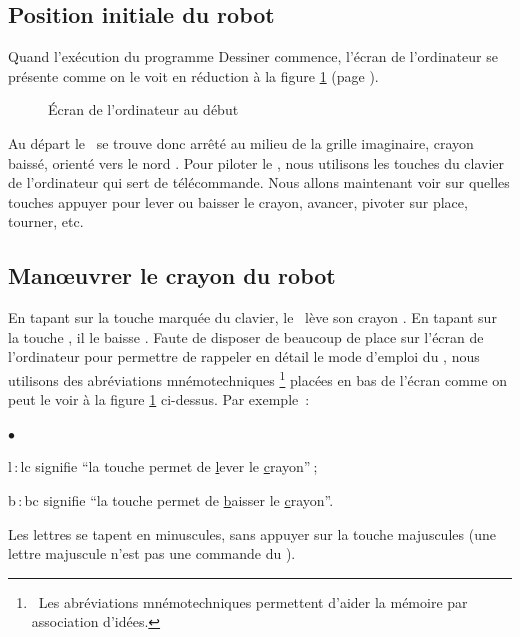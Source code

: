 \subsection{Position initiale du robot}

Quand l'exécution du programme {\idt Des\-si\-ner}
commence, l'écran 
de l'ordinateur se présente comme on le voit en réduction à la figure 
\ref{fig:ecran-initial-1}  (page \pageref{fig:ecran-initial-1}).
\begin{figure}[htbp]
 \caption{Écran de l'ordinateur au début}
 \label{fig:ecran-initial-1}
\end{figure}
Au départ le \robot\ se trouve donc arrêté au milieu de la grille
imaginaire, crayon baissé, or\-ienté vers le nord \robotCbN\/.
Pour piloter le \robot, nous utilisons les touches du clavier de 
l'ordinateur qui sert de télécommande. Nous allons maintenant
voir sur quelles touches appuyer pour lever ou baisser le crayon, 
avancer, pivoter sur place, tourner, etc.

\subsection{Manœuvrer le crayon du robot}

 En tapant sur la touche marquée  du
clavier, le \robot\ lève son crayon \robotClN\/. En tapant sur la touche 
, il le baisse \robotCbN\/. Faute de disposer de beaucoup de place sur l'écran 
de l'ordinateur pour
permettre de rappeler en détail le mode d'emploi du \robot, nous utilisons
des abréviations mnémotechniques%
%
\footnote{\ Les abréviations mnémotechniques permettent d'aider la mémoire par association d'idées.}
placées en bas de l'écran comme on peut
le voir à la figure 
\ref{fig:ecran-initial-1} ci-dessus. 
Par \hbox{exemple~:}
\begin{list}{$\scriptscriptstyle\bullet$}{
}
\item {\idt l}\,$:${\idt lc} signifie ``la touche  permet de {\underline l}ever le \hbox{{\underline c}rayon''$\:$;}
\item {\idt b}\,$:${\idt bc} signifie ``la touche  permet de {\underline b}aisser le \hbox{{\underline c}rayon''.}
\end{list}
Les lettres se tapent en minuscules, sans appuyer sur la touche majuscules
(une lettre majuscule n'est pas une commande du \robot).

